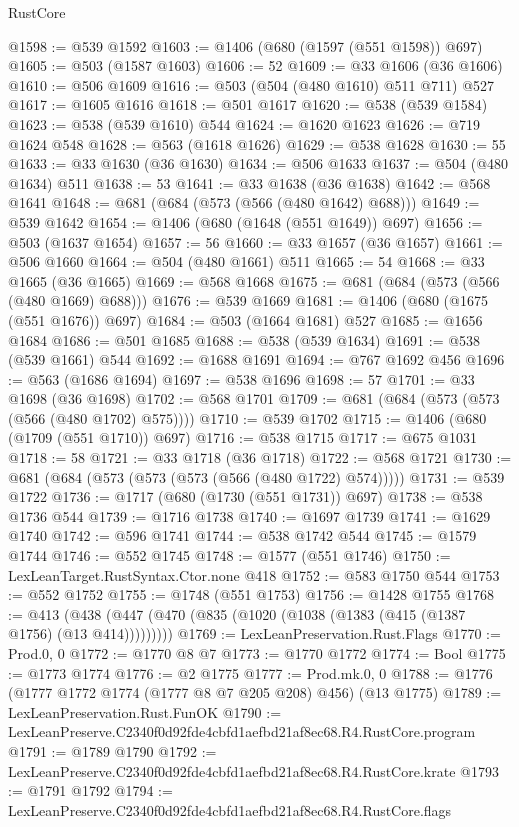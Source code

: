 \begin{lexlean}{RustCore}
\begin{coremodule}
@1598 := @539 @1592
@1603 := @1406 (@680 (@1597 (@551 @1598)) @697)
@1605 := @503 (@1587 @1603)
@1606 := 52
@1609 := @33 @1606 (@36 @1606)
@1610 := @506 @1609
@1616 := @503 (@504 (@480 @1610) @511 @711) @527
@1617 := @1605 @1616
@1618 := @501 @1617
@1620 := @538 (@539 @1584)
@1623 := @538 (@539 @1610) @544
@1624 := @1620 @1623
@1626 := @719 @1624 @548
@1628 := @563 (@1618 @1626)
@1629 := @538 @1628
@1630 := 55
@1633 := @33 @1630 (@36 @1630)
@1634 := @506 @1633
@1637 := @504 (@480 @1634) @511
@1638 := 53
@1641 := @33 @1638 (@36 @1638)
@1642 := @568 @1641
@1648 := @681 (@684 (@573 (@566 (@480 @1642) @688)))
@1649 := @539 @1642
@1654 := @1406 (@680 (@1648 (@551 @1649)) @697)
@1656 := @503 (@1637 @1654)
@1657 := 56
@1660 := @33 @1657 (@36 @1657)
@1661 := @506 @1660
@1664 := @504 (@480 @1661) @511
@1665 := 54
@1668 := @33 @1665 (@36 @1665)
@1669 := @568 @1668
@1675 := @681 (@684 (@573 (@566 (@480 @1669) @688)))
@1676 := @539 @1669
@1681 := @1406 (@680 (@1675 (@551 @1676)) @697)
@1684 := @503 (@1664 @1681) @527
@1685 := @1656 @1684
@1686 := @501 @1685
@1688 := @538 (@539 @1634)
@1691 := @538 (@539 @1661) @544
@1692 := @1688 @1691
@1694 := @767 @1692 @456
@1696 := @563 (@1686 @1694)
@1697 := @538 @1696
@1698 := 57
@1701 := @33 @1698 (@36 @1698)
@1702 := @568 @1701
@1709 := @681 (@684 (@573 (@573 (@566 (@480 @1702) @575))))
@1710 := @539 @1702
@1715 := @1406 (@680 (@1709 (@551 @1710)) @697)
@1716 := @538 @1715
@1717 := @675 @1031
@1718 := 58
@1721 := @33 @1718 (@36 @1718)
@1722 := @568 @1721
@1730 := @681 (@684 (@573 (@573 (@573 (@566 (@480 @1722) @574)))))
@1731 := @539 @1722
@1736 := @1717 (@680 (@1730 (@551 @1731)) @697)
@1738 := @538 @1736 @544
@1739 := @1716 @1738
@1740 := @1697 @1739
@1741 := @1629 @1740
@1742 := @596 @1741
@1744 := @538 @1742 @544
@1745 := @1579 @1744
@1746 := @552 @1745
@1748 := @1577 (@551 @1746)
@1750 := LexLeanTarget.RustSyntax.Ctor.none @418
@1752 := @583 @1750 @544
@1753 := @552 @1752
@1755 := @1748 (@551 @1753)
@1756 := @1428 @1755
@1768 := @413 (@438 (@447 (@470 (@835 (@1020 (@1038 (@1383 (@415 (@1387 @1756) (@13 @414)))))))))
@1769 := LexLeanPreservation.Rust.Flags
@1770 := Prod.{0, 0}
@1772 := @1770 @8 @7
@1773 := @1770 @1772
@1774 := Bool
@1775 := @1773 @1774
@1776 := @2 @1775
@1777 := Prod.mk.{0, 0}
@1788 := @1776 (@1777 @1772 @1774 (@1777 @8 @7 @205 @208) @456) (@13 @1775)
@1789 := LexLeanPreservation.Rust.FunOK
@1790 := LexLeanPreserve.C2340f0d92fde4cbfd1aefbd21af8ec68.R4.RustCore.program
@1791 := @1789 @1790
@1792 := LexLeanPreserve.C2340f0d92fde4cbfd1aefbd21af8ec68.R4.RustCore.krate
@1793 := @1791 @1792
@1794 := LexLeanPreserve.C2340f0d92fde4cbfd1aefbd21af8ec68.R4.RustCore.flags

\end{coremodule}
\end{lexlean}
